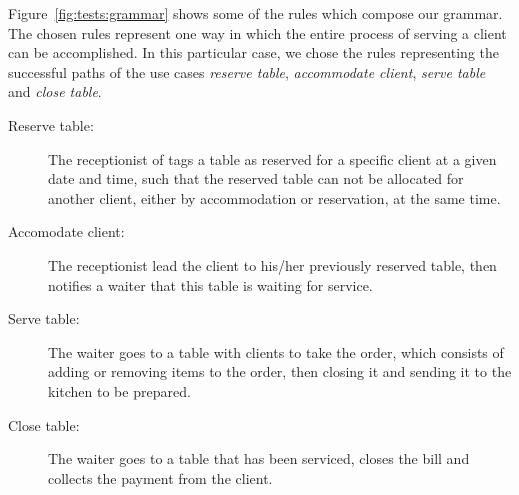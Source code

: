 \begin{example} Figure~\ref{fig:tests:grammar} shows some of the rules which compose our grammar. The chosen rules represent one way in which the entire process of serving a client can be accomplished. In this particular case, we chose the rules representing the successful paths of the use cases \emph{reserve table}, \emph{accommodate client}, \emph{serve table} and \emph{close table}.

\begin{description}
  \item[Reserve table:] The receptionist of tags a table as reserved for a specific client at a given date and time, such that the reserved table can not be allocated for another client, either by accommodation or reservation, at the same time.
  \item[Accomodate client:] The receptionist lead the client to his/her previously reserved table, then notifies a waiter that this table is waiting for service.
  \item[Serve table:] The waiter goes to a table with clients to take the order, which consists of adding or removing items to the order, then closing it and sending it to the kitchen to be prepared.
  \item[Close table:] The waiter goes to a table that has been serviced, closes the bill and collects the payment from the client.
\end{description}


\end{example}

